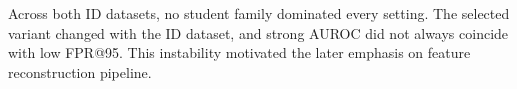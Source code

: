 \begin{landscape}
Across both ID datasets, no student family dominated every setting. The
selected variant changed with the ID dataset, and strong AUROC did not always
coincide with low FPR@95. This instability motivated the later emphasis on
feature reconstruction pipeline.

\end{landscape}
\clearpage
